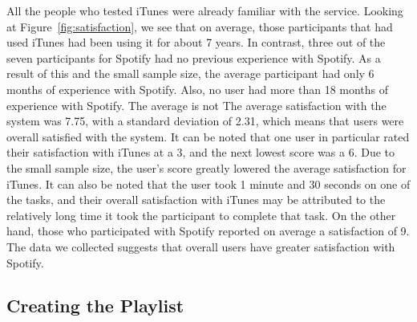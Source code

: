 \documentclass[11pt]{article}
\begin{document}
All the people who tested iTunes were already familiar with the service. Looking at Figure~\ref{fig:satisfaction}, we see that on average, those participants that had used iTunes had been using it for about 7 years. In contrast, three out of the seven participants for Spotify had no previous experience with Spotify. As a result of this and the small sample size, the average participant had only 6 months of experience with Spotify. Also, no user had more than 18 months of experience with Spotify. The average is not %
The average satisfaction with the system was 7.75, with a standard deviation of 2.31, which means that users were overall satisfied with the system. It can be noted that one user in particular rated their satisfaction with iTunes at a 3, and the next lowest score was a 6. Due to the small sample size, the user's score greatly lowered the average satisfaction for iTunes. It can also be noted that the user took 1 minute and 30 seconds on one of the tasks, and their overall satisfaction with iTunes may be attributed to the relatively long time it took the participant to complete that task. On the other hand, those who participated with Spotify reported on average a satisfaction of 9. The data we collected suggests that overall users have greater satisfaction with Spotify.

\subsection{Creating the Playlist}
\end{document}
